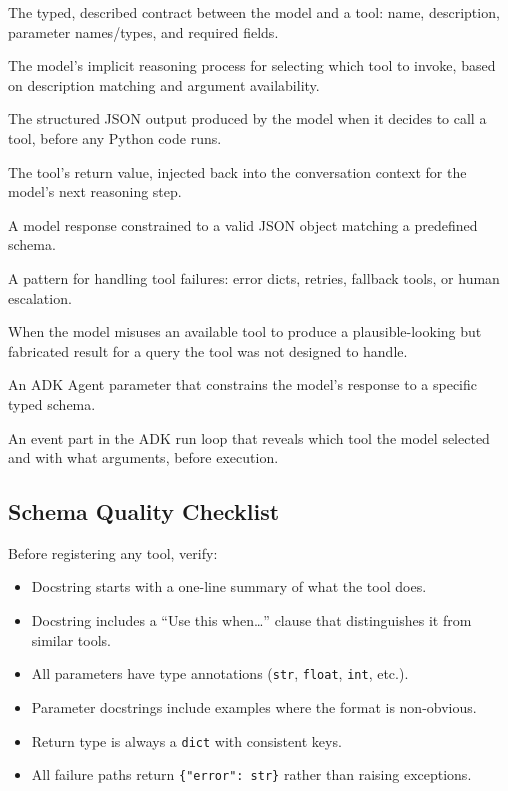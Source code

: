 \documentclass[12pt, a4paper]{article}
\begin{document}
\begin{description}[leftmargin=4cm, style=nextline, font=\bfseries\color{keyterm}]
  \item[Function schema] The typed, described contract between the model and a tool: name, description, parameter names/types, and required fields.
  \item[Tool routing] The model's implicit reasoning process for selecting which tool to invoke, based on description matching and argument availability.
  \item[Tool-use block] The structured JSON output produced by the model when it decides to call a tool, before any Python code runs.
  \item[Observation] The tool's return value, injected back into the conversation context for the model's next reasoning step.
  \item[Structured output] A model response constrained to a valid JSON object matching a predefined schema.
  \item[Fallback strategy] A pattern for handling tool failures: error dicts, retries, fallback tools, or human escalation.
  \item[Hallucinated tool call] When the model misuses an available tool to produce a plausible-looking but fabricated result for a query the tool was not designed to handle.
  \item[output\_schema] An ADK Agent parameter that constrains the model's response to a specific typed schema.
  \item[function\_call part] An event part in the ADK run loop that reveals which tool the model selected and with what arguments, before execution.
\end{description}

\subsection*{Schema Quality Checklist}

Before registering any tool, verify:

\begin{itemize}[leftmargin=*, itemsep=2pt]
  \item[$\square$] Docstring starts with a one-line summary of what the tool does.
  \item[$\square$] Docstring includes a ``Use this when\ldots'' clause that distinguishes it from similar tools.
  \item[$\square$] All parameters have type annotations (\texttt{str}, \texttt{float}, \texttt{int}, etc.).
  \item[$\square$] Parameter docstrings include examples where the format is non-obvious.
  \item[$\square$] Return type is always a \texttt{dict} with consistent keys.
  \item[$\square$] All failure paths return \texttt{\{"error": str\}} rather than raising exceptions.
\end{itemize}
\end{document}
